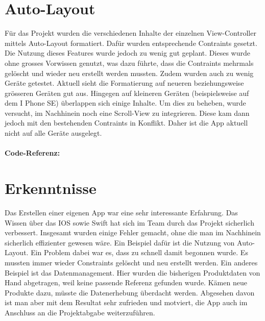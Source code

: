 \documentclass[12pt,titlepage]{article}
\begin{document}
\section*{Auto-Layout}
Für das Projekt wurden die verschiedenen Inhalte der einzelnen View-Controller mittels Auto-Layout formatiert. Dafür wurden entsprechende Contraints gesetzt. Die Nutzung dieses Features wurde jedoch zu wenig gut geplant. Dieses wurde ohne grosses Vorwissen genutzt, was dazu führte, dass die Contraints mehrmals gelöscht und wieder neu erstellt werden mussten. Zudem wurden auch zu wenig Geräte getestet. Aktuell sieht die Formatierung auf neueren beziehungsweise grösseren Geräten gut aus. Hingegen auf kleineren Geräten (beispielsweise auf dem I Phone SE) überlappen sich einige Inhalte. Um dies zu beheben, wurde versucht, im Nachhinein noch eine Scroll-View zu integrieren. Diese kam dann jedoch mit den bestehenden Contraints in Konflikt. Daher ist die App aktuell nicht auf alle Geräte ausgelegt.\\
\\
\textbf{Code-Referenz: }\\ 

\section*{Erkenntnisse}
Das Erstellen einer eigenen App war eine sehr interessante Erfahrung. Das Wissen über das IOS sowie Swift hat sich im Team durch das Projekt sicherlich verbessert. Insgesamt wurden einige Fehler gemacht, ohne die man im Nachhinein sicherlich effizienter gewesen wäre. Ein Beispiel dafür ist die Nutzung von Auto-Layout. Ein Problem dabei war es, dass zu schnell damit begonnen wurde. Es mussten immer wieder Constraints gelöscht und neu erstellt werden. Ein anderes Beispiel ist das Datenmanagement. Hier wurden die bisherigen Produktdaten von Hand abgetragen, weil keine passende Referenz gefunden wurde. Kämen neue Produkte dazu, müsste die Datenerhebung überdacht werden. Abgesehen davon ist man aber mit dem Resultat sehr zufrieden und motviert, die App auch im Anschluss an die Projektabgabe weiterzuführen.
\end{document}
